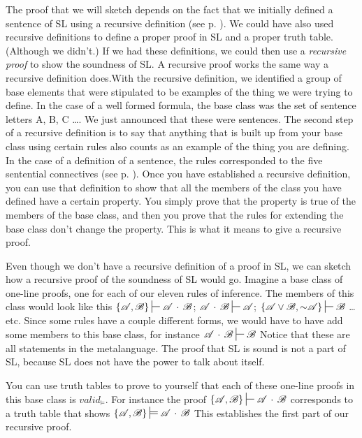 {The proof that we will sketch depends on the fact that we initially defined a sentence of SL using a recursive definition (see p. \pageref{def:recursive_definition}). We could have also used recursive definitions to define a proper proof in SL and a proper truth table. (Although we didn't.) If we had these definitions, we could then use a \emph{recursive proof} to show the soundness of SL. A recursive proof works the same way a recursive definition does.With the recursive definition, we identified a group of base elements that were stipulated to be examples of the thing we were trying to define. In the case of a well formed formula, the base class was the set of sentence letters A, B, C \ldots{}. We just announced that these were sentences. The second step of a recursive definition is to say that anything that is built up from your base class using certain rules also counts as an example of the thing you are defining. In the case of a definition of a sentence, the rules corresponded to the five sentential connectives (see p. \pageref{def:sentence_of_SL}). Once you have established a recursive definition, you can use that definition to show that all the members of the class you have defined have a certain property. You simply prove that the property is true of the members of the base class, and then you prove that the rules for extending the base class don't change the property. This is what it means to give a recursive proof.

Even though we don't have a recursive definition of a proof in SL, we can sketch how a recursive proof of the soundness of SL would go. Imagine a base class of one-line proofs, one for each of our eleven rules of inference. The members of this class would look like this $\{\script{A}, \script{B}\} \sststile{}{} \script{A} \eand \script{B}$; $\script{A} \eand \script{B} \sststile{}{}\script{A}$; $\{\script{A} \eor \script{B}, \enot\script{A}\} \sststile{}{} \script{B}$ \ldots{} etc. Since some rules have a couple different forms, we would have to have add some members to this base class, for instance $\script{A} \eand \script{B} \sststile{}{} \script{B}$ Notice that these are all statements in the metalanguage. The proof that SL is sound is not a part of SL, because SL does not have the power to talk about itself. 

You can use truth tables to prove to yourself that each of these one-line proofs in this base class is $valid_{\models}$. For instance the proof $\{\script{A}, \script{B}\} \sststile{}{} \script{A} \eand \script{B}$ corresponds to a truth table that shows $\{\script{A}, \script{B}\} \sdtstile{}{} \script{A} \eand \script{B}$ This establishes the first part of our recursive proof. 

}
